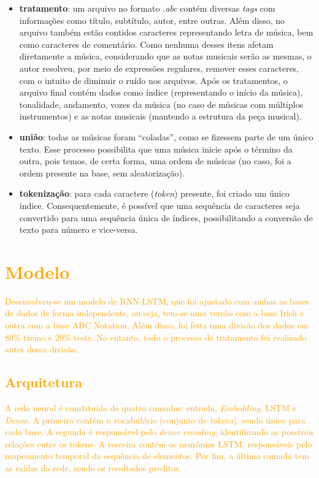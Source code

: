 \documentclass{automatextcc}
\newcommand{\nico}[1]{\textcolor{orange}{#1}}
\begin{document}
\begin{itemize}
    \item \textbf{tratamento}: um arquivo no formato \textit{.abc} contém diversas \textit{tags} com informações como título, subtítulo, autor, entre outras. Além disso, no arquivo também estão contidos caracteres representando letra de música, bem como caracteres de comentário. Como nenhuma desses itens afetam diretamente a música, considerando que as notas musicais serão as mesmas, o autor resolveu, por meio de expressões regulares, remover esses caracteres, com o intuito de diminuir o ruído nos arquivos. Após os tratamentos, o arquivo final contém dados como índice (representando o início da música), tonalidade, andamento, vozes da música (no caso de músicas com múltiplos instrumentos) e as notas musicais (mantendo a estrutura da peça musical).
    \item \textbf{união}: todas as músicas foram ``coladas'', como se fizessem parte de um único texto. Esse processo possibilita que uma música inicie após o término da outra, pois temos, de certa forma, uma ordem de músicas (no caso, foi a ordem presente na base, sem aleatorização).
    \item \textbf{tokenização}: para cada caractere (\textit{token}) presente, foi criado um único índice. Consequentemente, é possível que uma sequência de caracteres seja convertido para uma sequência única de índices, possibilitando a conversão de texto para número e vice-versa.
\end{itemize}

\section{\nico{Modelo}}
\nico{
Desenvolveu-se um modelo de RNN-LSTM, que foi ajustado com ambas as bases de dados de forma independente, ou seja, tem-se uma versão com a base Irish e outra com a base ABC Notation. Além disso, foi feita uma divisão dos dados em 80\% treino e 20\% teste. No entanto, todo o processo de tratamento foi realizado antes dessa divisão.
}

\subsection{\nico{Arquitetura}}
\nico{
A rede neural é constituída de quatro camadas: entrada, \textit{Embedding}, LSTM e \textit{Dense}. A primeira contém o vocabulário (conjunto de \textit{tokens}), sendo único para cada base. A segunda é responsável pelo \textit{dense encoding}, identificando as possíveis relações entre os tokens. A terceira contém os neurônios LSTM, responsáveis pelo mapeamento temporal da sequência de elementos. Por fim, a última camada tem as saídas da rede, sendo os resultados preditos.
}
\end{document}
